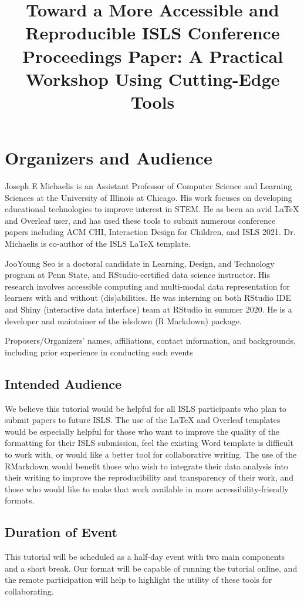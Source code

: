 \documentclass{article}
\title{Toward a More Accessible and Reproducible ISLS Conference Proceedings Paper: A Practical Workshop Using Cutting-Edge Tools}
\author{     }
\date{     }
\begin{document}
\section{Organizers and Audience}
Joseph E Michaelis is an Assistant Professor of Computer Science and Learning Sciences at the University of Illinois at Chicago. His work focuses on developing educational technologies to improve interest in STEM. He as been an avid LaTeX and Overleaf user, and has used these tools to submit numerous conference papers including ACM CHI, Interaction Design for Children, and ISLS 2021. Dr. Michaelis is co-author of the ISLS LaTeX template.

JooYoung Seo is a doctoral candidate in Learning, Design, and Technology program at Penn State, and RStudio-certified data science instructor. His research involves accessible computing and multi-modal data representation for learners with and without (dis)abilities. He was interning on both RStudio IDE and Shiny (interactive data interface) team at RStudio in summer 2020. He is a developer and maintainer of the islsdown (R Markdown) package.

Proposers/Organizers’ names, affiliations, contact information, and backgrounds, including prior experience in conducting such events

\subsection{Intended Audience}
We believe this tutorial would be helpful for all ISLS participants who plan to submit papers to future ISLS. The use of the LaTeX and Overleaf templates would be especially helpful for those who want to improve the quality of the formatting for their ISLS submission, feel the existing Word template is difficult to work with, or would like a better tool for collaborative writing. The use of the RMarkdown would benefit those who wish to integrate their data analysis into their writing to improve the reproducibility and transparency of their work, and those who would like to make that work available in more accessibility-friendly formats.

\subsection{Duration of Event}
This tutorial will be scheduled as a half-day event with two main components and a short break. Our format will be capable of running the tutorial online, and the remote participation will help to highlight the utility of these tools for collaborating.
\end{document}
